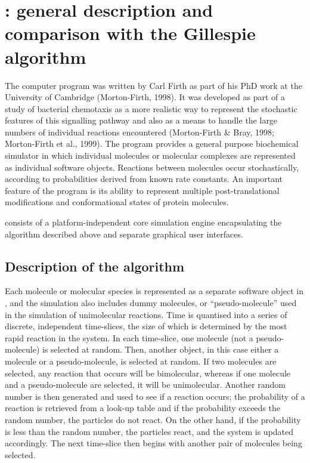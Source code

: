 \chapter[Comparison with the Gillespie algorithm]{\stochsim{}: general description and comparison with the Gillespie algorithm}

The computer program \stochsim{} was written by Carl Firth as part of his
PhD work at the University of Cambridge (Morton-Firth, 1998). It was
developed as part of a study of bacterial chemotaxis as a more
realistic way to represent the stochastic features of this signalling
pathway and also as a means to handle the large numbers of individual
reactions encountered (Morton-Firth \& Bray, 1998; Morton-Firth et
al., 1999). The program provides a general purpose biochemical
simulator in which individual molecules or molecular complexes are
represented as individual software objects. Reactions between
molecules occur stochastically, according to probabilities derived
from known rate constants.  An important feature of the program is its
ability to represent multiple post-translational modifications and
conformational states of protein molecules.

\stochsim{} consists of a platform-independent core simulation engine 
encapsulating the algorithm described above and separate graphical user 
interfaces.   

\section{Description of the algorithm}

Each molecule or molecular species is represented as a separate software object
in \stochsim{}, and the simulation also includes dummy molecules, or 
``pseudo-molecule'' used in the simulation of unimolecular reactions. Time is 
quantised into a series of discrete, independent time-slices, the size of 
which is determined by the most rapid reaction in the system. In each 
time-slice, one molecule (not a pseudo-molecule) is selected at random. Then, 
another object, in this case either a molecule or a pseudo-molecule, is 
selected at random. If two molecules are selected, any reaction that occurs 
will be bimolecular, whereas if one molecule and a pseudo-molecule are 
selected, it will be unimolecular. Another random number is then generated and 
used to see if a reaction occurs; the probability of a reaction is retrieved 
from a look-up table and if the probability exceeds the random number, the 
particles do not react. On the other hand, if the probability is less than the 
random number, the particles react, and the system is updated accordingly. The 
next time-slice then begins with another pair of molecules being selected. 

